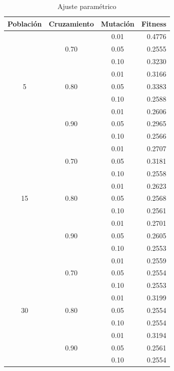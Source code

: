 \documentclass[journal]{IEEEtran}
\begin{document}
\begin{table}[h]
\caption{Ajuste paramétrico}
\centering
\begin{tabular}{|c|c|c||r|}
\hline
Población &Cruzamiento &Mutación &Fitness \\
\hline
\multirow{9}{*}{5}  & \multirow{3}{*}{0.70} & 0.01 & 0.4776 \\
                    &                       & 0.05 & 0.2555 \\
                    &                       & 0.10 & 0.3230 \\ \cline{2-4}
                    & \multirow{3}{*}{0.80} & 0.01 & 0.3166 \\
                    &                       & 0.05 & 0.3383 \\
                    &                       & 0.10 & 0.2588 \\ \cline{2-4}
                    & \multirow{3}{*}{0.90} & 0.01 & 0.2606 \\
                    &                       & 0.05 & 0.2965 \\
                    &                       & 0.10 & 0.2566 \\ \hline
\multirow{9}{*}{15} & \multirow{3}{*}{0.70} & 0.01 & 0.2707 \\
                    &                       & 0.05 & 0.3181 \\
                    &                       & 0.10 & 0.2558 \\ \cline{2-4}
                    & \multirow{3}{*}{0.80} & 0.01 & 0.2623 \\
                    &                       & 0.05 & 0.2568 \\
                    &                       & 0.10 & 0.2561 \\ \cline{2-4}
                    & \multirow{3}{*}{0.90} & 0.01 & 0.2701 \\
                    &                       & 0.05 & 0.2605 \\
                    &                       & 0.10 & 0.2553 \\ \hline
\multirow{9}{*}{30} & \multirow{3}{*}{0.70} & 0.01 & 0.2559 \\
                    &                       & 0.05 & 0.2554 \\
                    &                       & 0.10 & 0.2553 \\ \cline{2-4}
                    & \multirow{3}{*}{0.80} & 0.01 & 0.3199 \\
                    &                       & 0.05 & 0.2554 \\
                    &                       & 0.10 & 0.2554 \\ \cline{2-4}
                    & \multirow{3}{*}{0.90} & 0.01 & 0.3194 \\
                    &                       & 0.05 & 0.2561 \\
                    &                       & 0.10 & 0.2554 \\ \hline
\end{tabular}
\label{tab:tuning}
\end{table}
\end{document}
